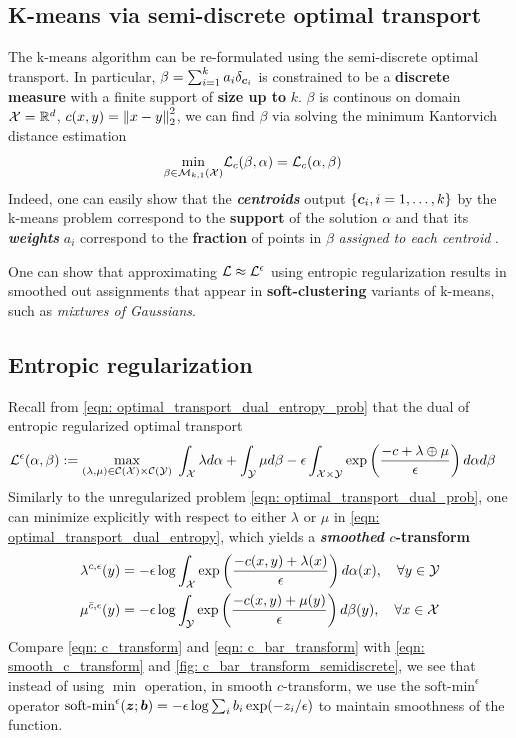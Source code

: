 \documentclass[11pt]{article}
\begin{document}
\subsection{K-means via semi-discrete optimal transport}
The k-means algorithm can be re-formulated using the semi-discrete optimal transport. In particular, $\beta = \sum_{i=1}^{k}a_i \delta_{\boldsymbol{c}_i}$ is constrained to be a \textbf{discrete measure} with a finite support of \textbf{size up to} $k$. $\beta$ is continous on domain ${\mathcal X}= {\mathbb R}^{d}$, $c(x, y) = \left\|x - y\right\|_{2}^2$, we can find $\beta$ via solving the minimum Kantorvich distance estimation 
\begin{align*}
\min_{\beta \in {\mathcal M}_{k, 1}({\mathcal X})}& {\mathcal L}_{c}(\beta, \alpha) = {\mathcal L}_{c}( \alpha, \beta)
\end{align*} Indeed, one can easily show that the \textbf{\emph{centroids}} output $\{\boldsymbol{c}_{i}, i=1,\ldots, k\}$ by the k-means problem correspond to the \textbf{support} of the solution $\alpha$ and that its \emph{\textbf{weights}} $a_i$ correspond to the \textbf{fraction} of points in $\beta$ \emph{assigned to each centroid} \citep{canas2012learning}.

One can show that approximating ${\mathcal L} \approx {\mathcal L}^{\epsilon}$ using entropic regularization results in smoothed out assignments that appear in \textbf{soft-clustering} variants of k-means, such as \emph{mixtures of Gaussians}.

\subsection{Entropic regularization}
Recall from \eqref{eqn: optimal_transport_dual_entropy_prob} that the dual of entropic regularized optimal transport
\begin{align}
{\mathcal L}^{\epsilon}(\alpha, \beta):= \max_{(\lambda,\mu) \in {\mathcal C}({\mathcal X}) \times {\mathcal C}({\mathcal Y})}\;& \int_{{\mathcal X}}\lambda d\alpha + \int_{{\mathcal Y}}\mu d\beta - \epsilon \int_{{\mathcal X} \times {\mathcal Y}}\exp\left(\frac{-c + \lambda\oplus \mu}{\epsilon}\right)d\alpha d\beta \label{eqn: optimal_transport_dual_entropy}
\end{align} Similarly to the unregularized problem \eqref{eqn: optimal_transport_dual_prob}, one can minimize explicitly with respect to either 
$\lambda$ or $\mu$ in \eqref{eqn: optimal_transport_dual_entropy}, which yields a\textbf{ \emph{smoothed} $c$-transform}
\begin{align}
\lambda^{c, \epsilon}(y) &= -\epsilon \log \int_{{\mathcal X}}\exp\left(\frac{-c(x, y) + \lambda(x)}{\epsilon}\right)d\alpha(x), \quad \forall  y \in {\mathcal Y} \label{eqn: smooth_c_transform}\\
\mu^{\bar{c}, \epsilon}(y) &= -\epsilon \log \int_{{\mathcal Y}}\exp\left(\frac{-c(x, y) + \mu(y)}{\epsilon}\right)d\beta(y), \quad \forall  x \in {\mathcal X} \label{eqn: smooth_c_bar_transform}
\end{align} Compare \eqref{eqn: c_transform} and \eqref{eqn: c_bar_transform} with \eqref{eqn: smooth_c_transform} and \eqref{fig: c_bar_transform_semidiscrete}, we see that instead of using $\min$ operation, in smooth $c$-transform, we use the \underline{$\text{soft-min}^{\epsilon}$} operator $\text{soft-min}^{\epsilon}(\boldsymbol{z}; \boldsymbol{b}) = - \epsilon\log \sum_i b_i \exp(-z_i/\epsilon)$ to maintain smoothness of the function. 
\end{document}
